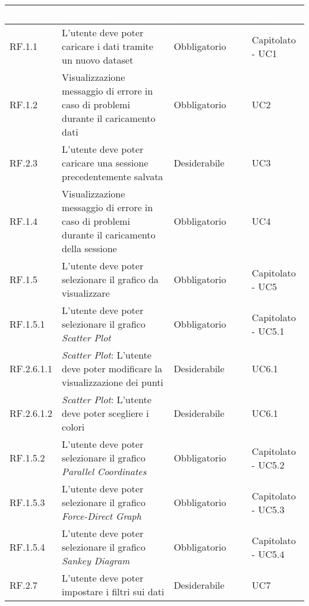 \begin{center}
  \centering
  \begin{longtable}{|L{1,5cm}|C{5,5cm}|C{3cm}|C{2cm}|}
    \hline
    \textcolor[HTML]{FFFFFF}{\textbf{Codice}} & \textcolor[HTML]{FFFFFF}{\textbf{Descrizione}} & \textcolor[HTML]{FFFFFF}{\textbf{Classificazione}} & \textcolor[HTML]{FFFFFF}{\textbf{Fonti}}
    \\ \hline
    RF.1.1 & L'utente deve poter caricare i dati tramite un nuovo dataset & Obbligatorio & Capitolato - UC1 \\ \hline
    RF.1.2 & Visualizzazione messaggio di errore in caso di problemi durante il caricamento dati & Obbligatorio & UC2 \\ \hline
    RF.2.3 & L'utente deve poter caricare una sessione precedentemente salvata & Desiderabile & UC3 \\ \hline
    RF.1.4 & Visualizzazione messaggio di errore in caso di problemi durante il caricamento della sessione & Obbligatorio & UC4 \\ \hline
    RF.1.5 & L'utente deve poter selezionare il grafico da visualizzare & Obbligatorio & Capitolato - UC5 \\ \hline
    RF.1.5.1 & L'utente deve poter selezionare il grafico \textit{Scatter Plot} & Obbligatorio & Capitolato - UC5.1 \\ \hline
    RF.2.6.1.1 & \textit{Scatter Plot}: L'utente deve poter modificare la visualizzazione dei punti & Desiderabile & UC6.1 \\ \hline
    RF.2.6.1.2 & \textit{Scatter Plot}: L'utente deve poter scegliere i colori  & Desiderabile & UC6.1 \\ \hline
    RF.1.5.2 & L'utente deve poter selezionare il grafico \textit{Parallel Coordinates} & Obbligatorio & Capitolato - UC5.2 \\ \hline
    RF.1.5.3 & L'utente deve poter selezionare il grafico \textit{Force-Direct Graph} & Obbligatorio & Capitolato - UC5.3 \\ \hline
    RF.1.5.4 & L'utente deve poter selezionare il grafico \textit{Sankey Diagram} & Obbligatorio & Capitolato - UC5.4 \\ \hline
    RF.2.7 & L'utente deve poter impostare i filtri sui dati & Desiderabile & UC7 \\ \hline

\end{longtable}
\end{center}
